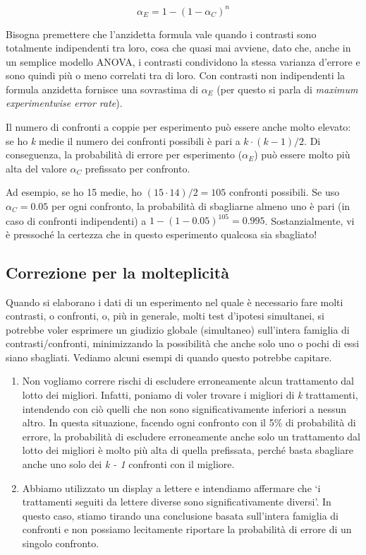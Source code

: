 \documentclass[a4paper,12pt,oneside]{book}
\providecommand{\tightlist}{%
  \setlength{\itemsep}{0pt}\setlength{\parskip}{0pt}}
\begin{document}
\[\alpha_E = 1 - (1 - \alpha_C)^n\]

Bisogna premettere che l'anzidetta formula vale quando i contrasti sono totalmente indipendenti tra loro, cosa che quasi mai avviene, dato che, anche in un semplice modello ANOVA, i contrasti condividono la stessa varianza d'errore e sono quindi più o meno correlati tra di loro. Con contrasti non indipendenti la formula anzidetta fornisce una sovrastima di \(\alpha_E\) (per questo si parla di \emph{maximum experimentwise error rate}).

Il numero di confronti a coppie per esperimento può essere anche molto elevato: se ho \emph{k} medie il numero dei confronti possibili è pari a \(k \cdot (k-1)/2\). Di conseguenza, la probabilità di errore per esperimento (\(\alpha_E\)) può essere molto più alta del valore \(\alpha_C\) prefissato per confronto.

Ad esempio, se ho 15 medie, ho \((15 \cdot 14)/2 = 105\) confronti possibili. Se uso \(\alpha_C = 0.05\) per ogni confronto, la probabilità di sbagliarne almeno uno è pari (in caso di confronti indipendenti) a \(1 - (1 - 0.05)^105 = 0.995\). Sostanzialmente, vi è pressoché la certezza che in questo esperimento qualcosa sia sbagliato!

\hypertarget{correzione-per-la-molteplicita}{%
\subsection{Correzione per la molteplicità}\label{correzione-per-la-molteplicita}}

Quando si elaborano i dati di un esperimento nel quale è necessario fare molti contrasti, o confronti, o, più in generale, molti test d'ipotesi simultanei, si potrebbe voler esprimere un giudizio globale (simultaneo) sull'intera famiglia di contrasti/confronti, minimizzando la possibilità che anche solo uno o pochi di essi siano sbagliati. Vediamo alcuni esempi di quando questo potrebbe capitare.

\begin{enumerate}
\def\labelenumi{\arabic{enumi}.}
\tightlist
\item
  Non vogliamo correre rischi di escludere erroneamente alcun trattamento dal lotto dei migliori. Infatti, poniamo di voler trovare i migliori di \emph{k} trattamenti, intendendo con ciò quelli che non sono significativamente inferiori a nessun altro. In questa situazione, facendo ogni confronto con il 5\% di probabilità di errore, la probabilità di escludere erroneamente anche solo un trattamento dal lotto dei migliori è molto più alta di quella prefissata, perché basta sbagliare anche uno solo dei \emph{k - 1} confronti con il migliore.
\item
  Abbiamo utilizzato un display a lettere e intendiamo affermare che `i trattamenti seguiti da lettere diverse sono significativamente diversi'. In questo caso, stiamo tirando una conclusione basata sull'intera famiglia di confronti e non possiamo lecitamente riportare la probabilità di errore di un singolo confronto.
\end{enumerate}
\end{document}
